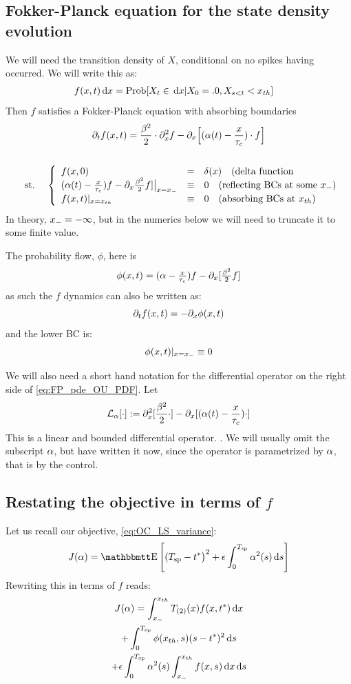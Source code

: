 \documentclass{article}
\begin{document}
\subsection{Fokker-Planck equation for the state density evolution}

We will need the transition density of $X$, conditional on no
spikes having occurred. We will write this as:
\begin{align*}
f(x,t) \, \mathrm{d} x &= \operatorname{Prob}[X_t\in \, \mathrm{d} x | X_0 = .0, X_{s<t} < { x_{th} }]  								  
\end{align*}
Then $f$ satisfies a Fokker-Planck equation with absorbing boundaries
\begin{equation}
\begin{gathered}
{\partial}_t f(x,t) =
				\frac{{\beta}^2 }{2}\cdot {\partial}^2_x f -  
				{\partial}_x \Big[ ({\alpha}(t)- \frac{x}{{ \tau_{c} }})  \cdot f \Big]
\\
\\
\begin{array}{lll}
	&\textrm{st.\ }& 
	\left\{ \begin{array}{lcl}
	 f(x,0) &=& \delta(x) \quad (\textrm{delta function}
	\\
	({\alpha}(t)- \tfrac x {{ \tau_{c} }})f - {\partial}_x \tfrac {{\beta}^2}2 f] \big|_{x={ x_{-} }} &\equiv& 0
	\quad (\textrm{reflecting BCs at some } { x_{-} } )
	\\
	f(x,t) |_{x={ x_{th} }} &\equiv& 0 \quad (\textrm{absorbing BCs at } { x_{th} })
\end{array} \right. 
\end{array}
\label{eq:FP_pde_OU_PDF}
\end{gathered}
\end{equation}
In theory, ${ x_{-} } = -\infty$, but in the numerics below we will need to
truncate it to some finite value.

The probability flow, $\phi$, here is
$$
\phi(x,t) = ({\alpha}- \tfrac x {{ \tau_{c} }})f - {\partial}_x [\tfrac {{\beta}^2}2 f]
$$
as such the $f$ dynamics can also be written as:
$$
{\partial}_t f(x,t) = - {\partial}_x \phi(x,t)
$$
and the lower BC is:
$$
\phi(x,t) |_{x={ x_{-} }} \equiv 0
$$

We will also need a short hand notation for the differential operator on the
right side of \cref{eq:FP_pde_OU_PDF}. Let
$$
{ \mathcal{L} }_{\alpha}[\cdot] := {\partial}^2_x [ \frac{{\beta}^2 }{2} \cdot] -  
				{\partial}_x  [ ({\alpha}(t)- \frac{x}{{ \tau_{c} }}) \cdot]
$$
This is a linear and bounded differential operator. . We will usually omit the
subscript ${\alpha}$, but have written it now, since the operator is parametrized by
${\alpha}$, that is by the control.


\subsection{Restating the objective in terms of $f$}
Let us recall our objective, \cref{eq:OC_LS_variance}:
$$
J(\a) = \Exp\left[
(\ts - \T \big)^2 
+  
\e \int_0^\ts  \a^2(s) \intd{s}
\right]
$$
Rewriting this in terms of $f$ reads:
\begin{multline}
J({\alpha}) = 
\int_{ x_{-} }^{ x_{th} } { {T}_{(2)} }(x) f(x,{ t^* }) \, \mathrm{d} x
\\
+ \int_0^{ T_{\textrm{sp} } } \phi({ x_{th} }, s) (s-{ t^* })^2 \, \mathrm{d} s
\\
+  {\epsilon} \int_0^{ T_{\textrm{sp} } }  {\alpha}^2(s)  \int_{ x_{-} }^{ x_{th} } f(x,s) \, \mathrm{d} x \, \mathrm{d} s
\label{eq:OC_LS_variance_density}
\end{multline}
\end{document}
